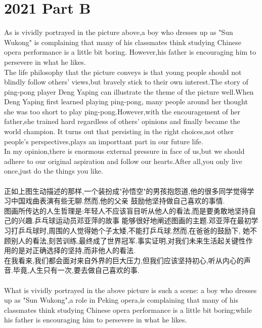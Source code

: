 \documentclass[UTF8]{article}
\begin{document}
    \section*{2021 Part B}
    As is vividly portrayed in the picture above,a boy who dresses up as "Sun Wukong" is complaining 
    that many of his classmates think studying Chinese opera performance is a little bit boring.
    However,his father is encouraging him to persevere in what he likes.\\
    The life philosophy that the picture conveys is that young people should not blindly follow 
    others' views,but bravely stick to their own interest.The story of ping-pong player Deng Yaping 
    can illustrate the theme of the picture well.When Deng Yaping first learned playing ping-pong,
    many people around her thought she was too short to play ping-pong.However,with the encouragement 
    of her father,she trained hard regardless of others' opinions and finally became the world champion.
    It turns out that persisting in the right choices,not other people's perspectives,plays an importtant 
    part in our future life.\\
    In my opinion,there is enormous external pressure in face of us,but we should adhere to our original 
    aspiration and follow our hearts.After all,you only live once,just do the things you like.\\
    \\
    正如上图生动描述的那样,一个装扮成"孙悟空"的男孩抱怨道,他的很多同学觉得学习中国戏曲表演有些无聊.然而,他的父亲
    鼓励他坚持做自己喜欢的事情.\\
    图画所传达的人生哲理是:年轻人不应该盲目听从他人的看法,而是要勇敢地坚持自己的兴趣.乒乓球运动员邓亚萍的故事
    能够很好地阐述图画的主题.邓亚萍在最初学习打乒乓球时,周围的人觉得她个子太矮,不能打乒乓球.然而,在爸爸的鼓励下,
    她不顾别人的看法,刻苦训练,最终成了世界冠军.事实证明,对我们未来生活起关键性作用的是对正确选择的坚持,而非他人的看法.\\
    在我看来,我们都会面对来自外界的巨大压力,但我们应该坚持初心,听从内心的声音.毕竟,人生只有一次,要去做自己喜欢的事.\\
    \\
    What is vividly portrayed in the above picture is such a scene:
    a boy who dresses up as "Sun Wukong",a role in Peking opera,is 
    complaining that many of his classmates think studying Chinese 
    opera performance is a little bit boring;while his father is 
    encouraging him to persevere in what he likes.\\
\end{document}
